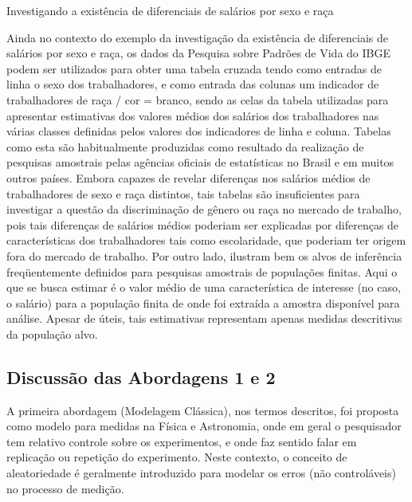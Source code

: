 \documentclass[]{book}
\theoremstyle{definition}
\theoremstyle{definition}
\theoremstyle{definition}
\theoremstyle{remark}
\begin{document}
Investigando a existência de diferenciais de salários por sexo e raça

Ainda no contexto do exemplo da investigação da existência de
diferenciais de salários por sexo e raça, os dados da Pesquisa sobre
Padrões de Vida do IBGE podem ser utilizados para obter uma tabela
cruzada tendo como entradas de linha o sexo dos trabalhadores, e como
entrada das colunas um indicador de trabalhadores de raça / cor =
branco, sendo as celas da tabela utilizadas para apresentar estimativas
dos valores médios dos salários dos trabalhadores nas várias classes
definidas pelos valores dos indicadores de linha e coluna. Tabelas como
esta são habitualmente produzidas como resultado da realização de
pesquisas amostrais pelas agências oficiais de estatísticas no Brasil e
em muitos outros países. Embora capazes de revelar diferenças nos
salários médios de trabalhadores de sexo e raça distintos, tais tabelas
são insuficientes para investigar a questão da discriminação de gênero
ou raça no mercado de trabalho, pois tais diferenças de salários médios
poderiam ser explicadas por diferenças de características dos
trabalhadores tais como escolaridade, que poderiam ter origem fora do
mercado de trabalho. Por outro lado, ilustram bem os alvos de inferência
freqüentemente definidos para pesquisas amostrais de populações finitas.
Aqui o que se busca estimar é o valor médio de uma característica de
interesse (no caso, o salário) para a população finita de onde foi
extraída a amostra disponível para análise. Apesar de úteis, tais
estimativas representam apenas medidas descritivas da população alvo.

\subsection{Discussão das Abordagens 1 e
2}\label{discussao-das-abordagens-1-e-2}

A primeira abordagem (Modelagem Clássica), nos termos descritos, foi
proposta como modelo para medidas na Física e Astronomia, onde em geral
o pesquisador tem relativo controle sobre os experimentos, e onde faz
sentido falar em replicação ou repetição do experimento. Neste contexto,
o conceito de aleatoriedade é geralmente introduzido para modelar os
erros (não controláveis) no processo de medição.
\end{document}
